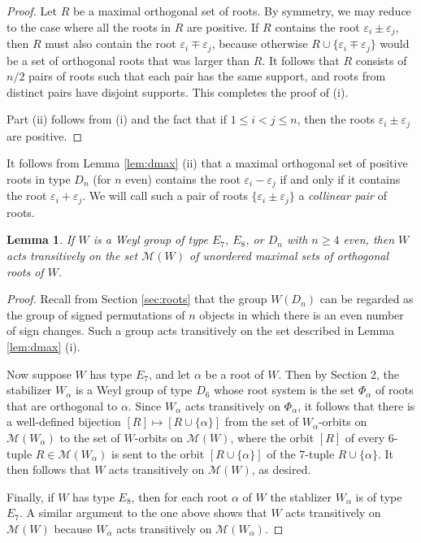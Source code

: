 \documentclass[11pt]{amsart}
\theoremstyle{plain}
\newtheorem{lemma}[theorem]{Lemma}
\theoremstyle{definition}
\theoremstyle{remark}
\numberwithin{equation}{subsection}
\newcommand{\al}{\alpha}
\newcommand{\ep}{\varepsilon}
\begin{document}
\begin{proof}
Let $R$ be a maximal orthogonal set of roots. By symmetry, we may reduce to the
case where all the roots in $R$ are positive.  If $R$ contains the root $\ep_i
\pm \ep_j$, then $R$ must also contain the root $\ep_i \mp \ep_j$, because
otherwise $R \cup \{\ep_i \mp \ep_j\}$ would be a set of orthogonal roots that
was larger than $R$. It follows that $R$ consists of $n/2$ pairs of roots such
that each pair has the same support, and roots from distinct pairs have disjoint
supports. This completes the proof of (i).

Part (ii) follows from (i) and the fact that if $1 \leq i < j \leq n$, then the
roots $\ep_i \pm \ep_j$ are positive.
\end{proof}

It follows from Lemma \ref{lem:dmax} (ii) that a maximal orthogonal set of
positive roots in type $D_n$ (for $n$ even) contains the root $\ep_i - \ep_j$ if
and only if it contains the root $\ep_i + \ep_j$. We will call such a pair of
roots $\{\ep_i \pm \ep_j\}$ a {\it collinear pair} of roots.

\begin{lemma}\label{lem:transitive}
If $W$ is a Weyl group of type $E_7$, $E_8$, or $D_n$ with $n \geq 4$ even, then
$W$ acts transitively on the set $\mathcal{M}(W)$ of unordered maximal sets of
orthogonal roots of $W$.
\end{lemma}

\begin{proof}
Recall from Section \ref{sec:roots} that the group $W(D_n)$ can be regarded as
the group of signed permutations of $n$ objects in which there is an even number
of sign changes. Such a group acts transitively on the set described in Lemma
\ref{lem:dmax} (i).

Now suppose $W$ has type $E_7$, and let $\al$ be a root of $W$. Then by Section
2, the stabilizer $W_\al$ is a Weyl group of type $D_6$ whose root system is the
set $\Phi_\alpha$ of roots that are orthogonal to $\alpha$.  Since $W_\alpha$
acts transitively on $\Phi_\alpha$, it follows that there is a well-defined
bijection $[R]\mapsto [R\cup\{\al\}]$ from the set of $W_\alpha$-orbits on
$\mathcal{M}(W_\alpha)$ to the set of $W$-orbits on $\mathcal{M}(W)$, where the
orbit $[R]$ of every 6-tuple $R\in \mathcal{M}(W_\alpha)$ is sent to the orbit
$[R\cup\{\al\}]$ of the 7-tuple $R\cup\{\al\}$. It then follows that $W$ acts
transitively on $\mathcal{M}(W)$, as desired.

Finally, if $W$ has type $E_8$, then for each root $\alpha$ of $W$ the stablizer
$W_\alpha$ is of type $E_7$. A similar argument to the one above shows that $W$
acts transitively on $\mathcal{M}(W)$ because $W_\alpha$ acts transitively on
$\mathcal{M}(W_\alpha)$.
\end{proof}
\end{document}
